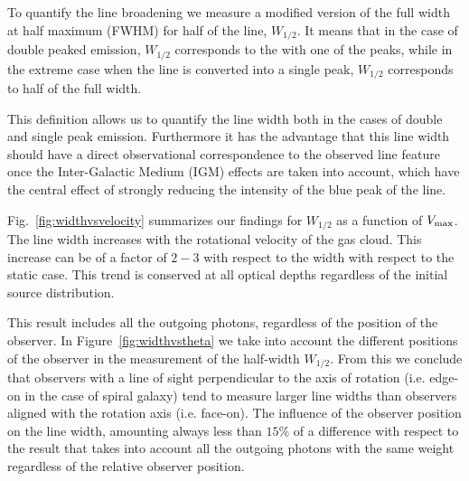 \documentclass[usenatbib]{mn2e}
\begin{document}
To quantify the line broadening we measure a modified version of the full
width at half maximum (FWHM) for half of the line, $W_{1/2}$. It means that in
the case of double peaked emission, $W_{1/2}$ corresponds to the with
one of the peaks, while in the extreme case when the line is converted
into a single peak, $W_{1/2}$ corresponds to half of the full width. 

This definition allows us to quantify the line width both in the cases
of double and single peak emission. Furthermore it has the advantage
that this line width should have a direct observational correspondence
to the observed line feature once the Inter-Galactic Medium (IGM)
effects are taken into account, which have the central effect of
strongly reducing the intensity of the blue peak of the line.

Fig.~\ref{fig:widthvsvelocity} summarizes our findings for $W_{1/2}$
as a function of $V_{\rm max}$. The line width increases with the
rotational velocity of the gas cloud. This increase can be of a factor
of $2-3$ with respect to the width with respect to the static
case. This trend is conserved at all optical depths regardless of the
initial source distribution. 

This result includes all the outgoing photons, regardless of the
position of the observer. In Figure~\ref{fig:widthvstheta} we
take into account the different positions of the observer in the
measurement of the half-width $W_{1/2}$. From this we conclude
that observers with a line of sight perpendicular to the axis of
rotation (i.e. edge-on in the case of spiral galaxy) tend to measure
larger line widths than observers aligned with the rotation axis
(i.e. face-on). The influence of the observer position on the line
width, amounting always less than $15\%$ of a difference with respect
to the result that takes into account all the outgoing photons with
the same weight regardless of the relative observer position.

\end{document}
